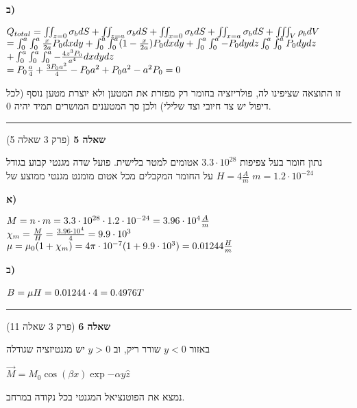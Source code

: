 \documentclass[14pt]{extarticle}
\makeatletter
\newenvironment{lefteqs}{%
    \begin{english}%
    \begin{flushleft}%
    \renewcommand{\arraystretch}{1.3}%
    $\begin{array}{@{}l@{}}%
}{%
    \end{array}$%
    \end{flushleft}%
    \end{english}%
}
\makeatother
\begin{document}
\textbf{ב)}

\begin{lefteqs}
    Q_{total} = \iint_{z=0} \sigma_b dS + \iint_{z=a} \sigma_b dS + \iint_{x=0} \sigma_b dS + \iint_{x=a} \sigma_b dS + \iiint_V \rho_b dV \\
    = \int_0^a \int_0^a \frac{x}{2a}P_0 dxdy + \int_0^a \int_0^a(1-\frac{x}{2a})P_0 dxdy  + \int_0^a \int_0^a -P_0 dydz \int_0^a \int_0^a P_0 dydz \\
    + \int_0^a \int_0^a \int_0^a -\frac{4z^3P_0}{a^4} dxdydz \\
    = P_0 \frac{a}{4} + \frac{3P_0 a^2}{4} - P_0 a^2 + P_0 a^2 - a^2 P_0 = 0
\end{lefteqs}

זו התוצאה שציפינו לה, פולריזציה בחומר רק מפזרת את המטען ולא יוצרת מטען נוסף (לכל דיפול יש צד חיובי וצד שלילי)
ולכן סך המטענים המושרים תמיד יהיה 0.


\vspace{3em}
\hrule
\vspace{2em}

\textbf{\large שאלה 5}
(פרק 3 שאלה 5) 

נתון חומר בעל צפיפות $3.3 \cdot 10^{28}$ אטומים למטר בלישית.
פועל שדה מגנטי קבוע בגודל $H=4\frac{A}{m}$ על החומר המקבלים מכל אטום מומנט מגנטי ממוצע של $m=1.2 \cdot 10^{-24}$

\textbf{א)}

\begin{lefteqs}
    M=n \cdot m = 3.3 \cdot 10^{28} \cdot 1.2 \cdot 10^{-24} = 3.96 \cdot 10^4 \frac{A}{m} \\
    \chi_m = \frac{M}{H} = \frac{3.96 \cdot 10^4}{4} = 9.9 \cdot 10^3 \\
    \mu = \mu_0 (1 + \chi_m) = 4\pi \cdot 10^{-7}(1+9.9 \cdot 10^3) = 0.01244 \frac{H}{m}
\end{lefteqs}

\textbf{ב)}
\begin{lefteqs}
    B = \mu H = 0.01244 \cdot 4 = 0.4976 T
\end{lefteqs}


\vspace{3em}
\hrule
\vspace{2em}

\textbf{\large שאלה 6}
(פרק 3 שאלה 11)

באזור $y<0$ שורר ריק, וב $y>0$ יש מגנטיזציה שגודלה

$\vec{M} = M_0 \cos(\beta x) \exp{-\alpha y} \hat{z}$

נמצא את הפוטנציאל המגנטי בכל נקודה במרחב.
\end{document}
